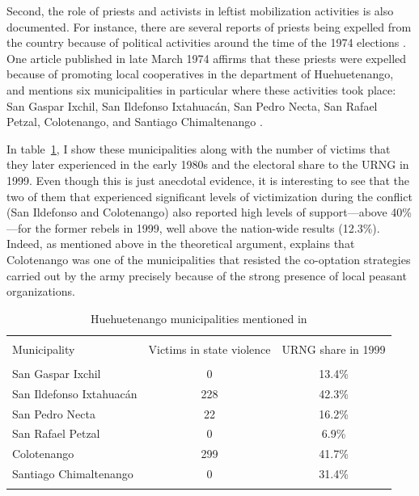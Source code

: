 \documentclass[12pt, notitlepage]{article}
\begin{document}

Second, the role of priests and activists in leftist mobilization activities is also documented.
For instance, there are several reports of priests being expelled from the country because of political activities around the time of the 1974 elections \citep{Imparcial:1974ab, Imparcial:1974uz}.
One article published in late March 1974 affirms that these priests were expelled because of promoting local cooperatives in the department of Huehuetenango, and mentions six municipalities in particular where these activities took place: San Gaspar Ixchil, San Ildefonso Ixtahuacán, San Pedro Necta, San Rafael Petzal, Colotenango, and Santiago Chimaltenango \citep{Imparcial:1974aa}.

In table~\ref{tab:6muni}, I show these municipalities along with the number of victims that they later experienced in the early 1980s and the electoral share to the URNG in 1999.
Even though this is just anecdotal evidence, it is interesting to see that the two of them that experienced significant levels of victimization during the conflict (San Ildefonso and Colotenango) also reported high levels of support---above 40\%---for the former rebels in 1999, well above the nation-wide results (12.3\%).
Indeed, as mentioned above in the theoretical argument, \citet[223--226]{Kobrak:2013aa} explains that Colotenango was one of the municipalities that resisted the co-optation strategies carried out by the army precisely because of the strong presence of local peasant organizations.

\begin{table}[!htbp] \centering
  \caption{Huehuetenango municipalities mentioned in \citet{Imparcial:1974aa}}\label{tab:6muni}
  \small

  \begin{tabular}{lcc}
  \\[-1.8ex]\hline
  \hline \\[-1.8ex]
  Municipality & Victims in state violence & URNG share in 1999  \\
  \hline \\[-1.8ex]
  San Gaspar Ixchil & 0 & 13.4\% \\
  San Ildefonso Ixtahuacán & 228 & 42.3\% \\
  San Pedro Necta & 22 & 16.2\% \\
  San Rafael Petzal & 0 & 6.9\% \\
  Colotenango & 299 & 41.7\% \\
  Santiago Chimaltenango & 0 & 31.4\% \\
  \hline
  \hline \\[-1.8ex]
  \end{tabular}

\end{table}
\end{document}
